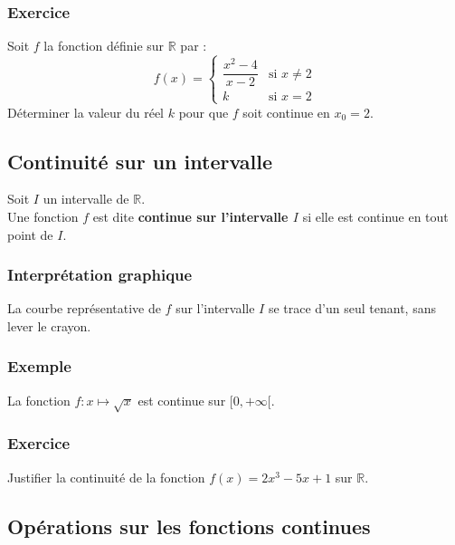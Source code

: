 \documentclass[12pt,a4paper]{article}
\begin{document}
\subsubsection*{Exercice}
Soit $f$ la fonction définie sur $\mathbb{R}$ par :
\[
f(x) = \begin{cases} \dfrac{x^2 - 4}{x - 2} & \text{si } x \neq 2 \\[8pt] k & \text{si } x = 2 \end{cases}
\]
Déterminer la valeur du réel $k$ pour que $f$ soit continue en $x_0 = 2$.

\vspace{0.5cm}
\subsection{Continuité sur un intervalle}

\begin{tcolorbox}[
    colframe=primary,
    colback=boxbg,
    coltitle=white,
    colbacktitle=titlebg,
    fonttitle=\bfseries,
    title=Définition,
    arc=3mm,
    boxrule=1pt
]
Soit $I$ un intervalle de $\mathbb{R}$.\\
Une fonction $f$ est dite \textbf{continue sur l'intervalle $I$} si elle est continue en tout point de $I$.
\end{tcolorbox}

\subsubsection*{Interprétation graphique}
La courbe représentative de $f$ sur l'intervalle $I$ se trace d'un seul tenant, sans lever le crayon.

\subsubsection*{Exemple}
La fonction $f : x \mapsto \sqrt{x}$ est continue sur $[0, +\infty[$.

\subsubsection*{Exercice}
Justifier la continuité de la fonction $f(x) = 2x^3 - 5x + 1$ sur $\mathbb{R}$.

\vspace{0.5cm}
\subsection{Opérations sur les fonctions continues}
\end{document}
